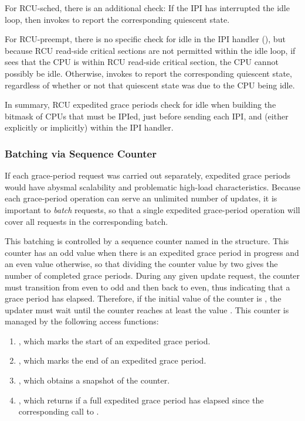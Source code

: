 For RCU-sched, there is an additional check:
If the IPI has interrupted
the idle loop, then  invokes
 to report the corresponding quiescent state.

For RCU-preempt, there is no specific check for idle in the IPI handler
(), but because RCU read-side critical sections are
not permitted within the idle loop, if  sees that
the CPU is within RCU read-side critical section, the CPU cannot
possibly be idle.
Otherwise,  invokes
 to report the corresponding quiescent state,
regardless of whether or not that quiescent state was due to the CPU
being idle.

In summary, RCU expedited grace periods check for idle when building the
bitmask of CPUs that must be IPIed, just before sending each IPI, and
(either explicitly or implicitly) within the IPI handler.

\subsubsection{Batching via Sequence Counter}

If each grace-period request was carried out separately, expedited grace
periods would have abysmal scalability and problematic high-load
characteristics.
Because each grace-period operation can serve an
unlimited number of updates, it is important to \emph{batch} requests, so
that a single expedited grace-period operation will cover all requests
in the corresponding batch.

This batching is controlled by a sequence counter named
 in the  structure.
This counter
has an odd value when there is an expedited grace period in progress and
an even value otherwise, so that dividing the counter value by two gives
the number of completed grace periods.
During any given update request,
the counter must transition from even to odd and then back to even, thus
indicating that a grace period has elapsed.
Therefore, if the initial
value of the counter is , the updater must wait until the counter
reaches at least the value .
This counter is managed by
the following access functions:

\begin{enumerate}
\item {}, which marks the start of an expedited
   grace period.
\item {}, which marks the end of an expedited grace
   period.
\item {}, which obtains a snapshot of the counter.
\item {}, which returns  if a full expedited
   grace period has elapsed since the corresponding call to
   .
\end{enumerate}

